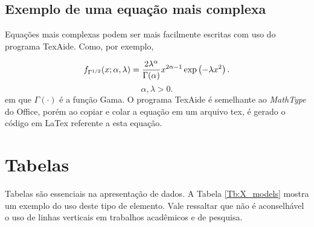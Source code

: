 \subsection{Exemplo de uma equação mais complexa}

  Equações mais complexas podem ser mais facilmente escritas com uso do programa TexAide. Como, por exemplo,

    \begin{equation}\label{Eq:sqrt_gamma_X}
    f_{\Gamma ^{{1 \mathord{\left/
    {\vphantom {1 2}} \right.
    \kern-\nulldelimiterspace} 2}} } (x;\alpha ,\lambda ) = \frac{{2\lambda ^\alpha  }}{{\Gamma (\alpha )}}x^{2\alpha  - 1} \exp \left( { - \lambda x^2 } \right).
    \end{equation}
    \[
    \alpha ,\lambda > 0.
    \]
    em que $\Gamma(\cdot)$ é a função Gama. O programa TexAide é semelhante ao \textit{MathType} do Office, porém ao copiar e colar a equação em um arquivo tex, é gerado o código em LaTex referente a esta equação.

\section{Tabelas}

Tabelas são essenciais na apresentação de dados. A Tabela \ref{Tb:X_models} mostra um exemplo do uso deste tipo de elemento. Vale ressaltar que não é aconselhável o uso de linhas verticais em trabalhos acadêmicos e de pesquisa.

